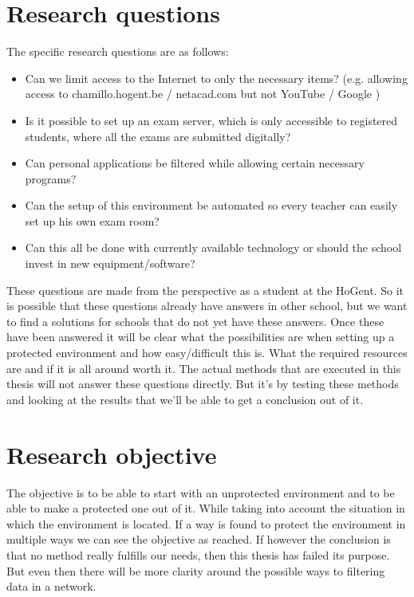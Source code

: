 \section{Research questions}
\label{sec:onderzoeksvraag}
The specific research questions are as follows:
\begin{itemize}
   \item Can we limit access to the Internet to only the necessary items? (e.g. allowing access to chamillo.hogent.be / netacad.com but not YouTube / Google )
   \item Is it possible to set up an exam server, which is only accessible to registered students, where all the exams are submitted digitally?
   \item Can personal applications be filtered while allowing certain necessary programs?
   \item Can the setup of this environment be automated so every teacher can easily set up his own exam room?
   \item Can this all be done with currently available technology or should the school invest in new equipment/software?
\end{itemize}
These questions are made from the perspective as a student at the HoGent. So it is possible that these questions already have answers in other school, but we want to find a solutions for schools that do not yet have these answers. Once these have been answered it will be clear what the possibilities are when setting up a protected environment and how easy/difficult this is. What the required resources are and if it is all around worth it. The actual methods that are executed in this thesis will not answer these questions directly. But it's by testing these methods and looking at the results that we'll be able to get a conclusion out of it.
\section{Research objective}
\label{sec:onderzoeksdoelstelling}
The objective is to be able to start with an unprotected environment and to be able to make a protected one out of it. While taking into account the situation in which the environment is located. If a way is found to protect the environment in multiple ways we can see the objective as reached. If however the conclusion is that no method really fulfills our needs, then this thesis has failed its purpose. But even then there will be more clarity around the possible ways to filtering data in a network.
